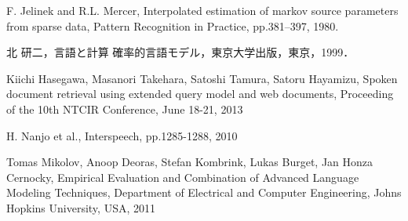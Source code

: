 \documentclass[a4paper,twocolumn,report,10.5pt]{jsbook}
\begin{document}
\begin{thebibliography}{99}
F. Jelinek and R.L. Mercer, Interpolated estimation of markov source parameters
from sparse data, Pattern Recognition in Practice, pp.381–397, 1980.



北 研二，言語と計算 確率的言語モデル，東京大学出版，東京，1999．

Kiichi Hasegawa, Masanori Takehara, Satoshi Tamura, Satoru Hayamizu, Spoken document retrieval using extended query model and web documents, Proceeding of the 10th NTCIR Conference, June 18-21, 2013


H. Nanjo et al., Interspeech, pp.1285-1288, 2010

Tomas Mikolov, Anoop Deoras, Stefan Kombrink, Lukas Burget, Jan Honza Cernocky, Empirical Evaluation and Combination of Advanced Language Modeling Techniques, Department of Electrical and Computer Engineering, Johns Hopkins University, USA, 2011









\end{thebibliography}
\end{document}
